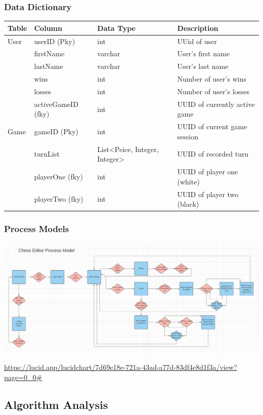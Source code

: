 \documentclass[11pt]{article}
\begin{document}
\subsubsection{Data Dictionary}
\label{sec:org2f50371}
\begin{center}
\begin{tabular}{llll}
Table & Column & Data Type & Description\\
\hline
User & userID (Pky) & int & UUid of user\\
 & firstName & varchar & User's first name\\
 & lastName & varchar & User's last name\\
 & wins & int & Number of user's wins\\
 & losses & int & Number of user's losses\\
 & activeGameID (fky) & int & UUID of currently active game\\
Game & gameID (Pky) & int & UUID of current game session\\
 & turnList & List<Peice, Integer, Integer> & UUID of recorded turn\\
 & playerOne (fky) & int & UUID of player one (white)\\
 & playerTwo (fky) & int & UUID of player two (black)\\
\end{tabular}
\end{center}
\subsubsection{Process Models}
\label{sec:org77ec639}
\begin{center}
\includegraphics[width=.9\linewidth]{ diagrams/out/ProcessModel.png}
\end{center}
\url{https://lucid.app/lucidchart/7d69e18e-721a-43ad-a77d-83df4e8d1f3a/view?page=0\_0\#}
\subsection{Algorithm Analysis}
\label{sec:orgebb9b3c}
\end{document}
